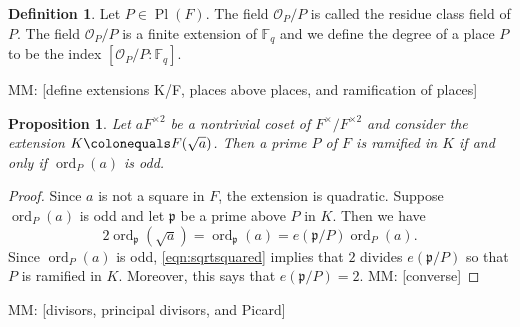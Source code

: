 \documentclass{dcthesis}
\newcommand{\defi}[1]{\textsf{#1}}
\newcommand{\mm}[1]{{\color{blue} \sf MM: [#1]}}
\newcommand{\FF}{\mathbb{F}}
\DeclareMathOperator{\ord}{ord}
\DeclareMathOperator{\Pl}{Pl}
\numberwithin{equation}{section}
\newtheorem{prop}[equation]{Proposition}
\theoremstyle{definition}
\newtheorem{definition}[equation]{Definition}
\theoremstyle{remark}
\begin{document}
{{{\begin{definition}
      \label{def:residueclassfield}
      Let $P\in\Pl(F)$.
      The field $\mathcal{O}_P/P$ is called the
      \defi{residue class field} of $P$.
      The field $\mathcal{O}_P/P$ is a finite
      extension of $\FF_q$
      and we define the
      \defi{degree of a place $P$}
      to be the index
      $[\mathcal{O}_P/P:\FF_q]$.
    \end{definition}
    \mm{define extensions K/F, places above places, and ramification of places}
    \begin{prop}
      \label{prop:kummerramification}
      Let $aF^{\times 2}$ be a nontrivial
      coset of $F^\times/F^{\times 2}$
      and consider the extension
      $K\colonequals F(\sqrt{a})$.
      Then a prime $P$ of $F$ is ramified
      in $K$ if and only if
      $\ord_P(a)$ is odd.
    \end{prop}
    \begin{proof}
      Since $a$ is not a square in $F$,
      the extension is quadratic.
      Suppose $\ord_P(a)$ is odd
      and let $\mathfrak{p}$ be
      a prime above $P$ in $K$.
      Then we have
      \begin{equation}
        \label{eqn:sqrtsquared}
        2\ord_{\mathfrak{p}}(\sqrt{a})
        = \ord_{\mathfrak{p}}(a)
        = e(\mathfrak{p}/P)\ord_P(a).
      \end{equation}
      Since $\ord_P(a)$ is odd,
      \eqref{eqn:sqrtsquared}
      implies that $2$ divides
      $e(\mathfrak{p}/P)$ so that
      $P$ is ramified in $K$.
      Moreover, this says that
      $e(\mathfrak{p}/P) = 2$.
      \mm{converse}
    \end{proof}
    \mm{divisors, principal divisors, and Picard}
  }
}}
\end{document}
